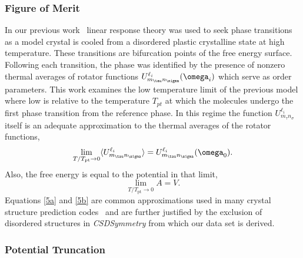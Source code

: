 \documentclass[preprint]{iucr}              %
\newcommand{\mb}[1]{\ensuremath{\mbox{\boldmath $ #1 $}}}
\newcommand{\av}[1]{\ensuremath{\langle #1 \rangle}}
\begin{document}
\subsubsection{Figure of Merit}

In our previous work~\cite{Keith04c,Mettes04} linear response theory
was used to seek phase transitions as a model crystal is cooled from
a disordered plastic crystalline state at high temperature. These
transitions are bifurcation points of the free energy surface.
Following each transition, the phase was identified by the presence
of nonzero thermal averages of rotator functions $U^{\ell_i}_{m_\tau
n_\sigma}(\mb{\omega}_i)$ which serve as order parameters. This work
examines the low temperature limit of the previous model where low
is relative to the temperature $T_{pt}$ at which the molecules
undergo the first
phase transition from the reference phase. %
In this regime the function $U^{\ell_i}_{m_\tau n_\sigma}$ itself is
an adequate approximation to the thermal averages of the rotator
functions,
\begin{equation}\label{5a}
\lim_{T/T_{\mathrm{pt}}\rightarrow 0}\av{U^{\ell_i}_{m_\tau
n_\sigma}}=U^{\ell_i}_{m_\tau n_\sigma}(\mb{\omega}_0).
\end{equation}
Also, the free energy is equal to the potential in that limit,
\begin{equation}\label{5b}
\lim_{T/T_{\mathrm{pt}}\rightarrow 0}A=V.
\end{equation}
Equations \ref{5a} and \ref{5b} are common approximations used in
many crystal structure prediction codes~\cite{Verwer98} and are
further justified by the exclusion of disordered structures in
\emph{CSDSymmetry} from which our data set is derived.

\subsubsection{Potential Truncation}
\label{truncation}
\end{document}
